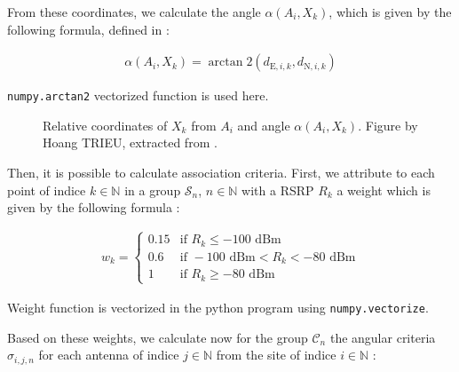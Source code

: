 \documentclass[a4paper, 11pt]{report}
\begin{document}
    From these coordinates, we calculate the angle $\alpha\left(A_i, X_k\right)$, which is given by the following formula, defined in \cite{trieu_visualization_2019}
  :
    
    \begin{align}
        \alpha\left(A_i, X_k\right) = \arctan2\left(d_{\text{E}, i, k}, d_{\text{N}, i, k}\right)
    \end{align}
    
    \texttt{numpy.arctan2} vectorized function is used here.
    
    \begin{figure}[H]
	\centering
	\caption{Relative coordinates of $X_k$ from $A_i$ and angle $\alpha\left(A_i, X_k\right)$. Figure by Hoang TRIEU, extracted from \cite{trieu_visualization_2019}.}
	\label{Plane coords and angle}
\end{figure}

    Then, it is possible to calculate association criteria. First, we attribute to each point of indice $k \in \mathbb{N}$ in a group $\mathcal{S}_n$, $n \in \mathbb{N}$ with a RSRP $R_k$ a weight which is given by the following formula \cite{trieu_visualization_2019}:
    
    \begin{align}
        w_k = \begin{cases}
        0.15  & \text {if }  R_k \leq -100 \text { dBm}\\
        0.6  &\text {if }  -100 \text { dBm} < R_k < -80 \text { dBm} \\
        1  &\text {if }  R_k \geq  -80 \text { dBm}
        \end{cases}
    \end{align}
    
    Weight function is vectorized in the python program using \texttt{numpy.vectorize}.
    
    Based on these weights, we calculate now for the group $\mathcal{C}_n$ the angular criteria $\sigma_{i, j, n}$ for each antenna of indice $j \in \mathbb{N}$ from the site of indice $i \in \mathbb{N}$ \cite{trieu_visualization_2019}:
    
\end{document}
